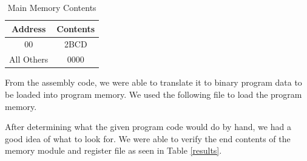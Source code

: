         \begin{table}[htbp]
           \caption{Main Memory Contents}
           \label{mainme}
           \centering
           \begin{tabular}{ c | c }
           Address         & Contents   \\
           \hline
           00  &   2BCD                 \\
           All Others  &   0000         \\
           
           \end{tabular}
        \end{table}

        From the assembly code, we were able to translate it to binary program data 
        to be loaded into program memory. We used the following file to load the program memory.
        

        After determining what the given program code would do by hand, we had a good idea of
        what to look for. We were able to verify the end contents of the memory module and register file as seen in Table \ref{results}.


